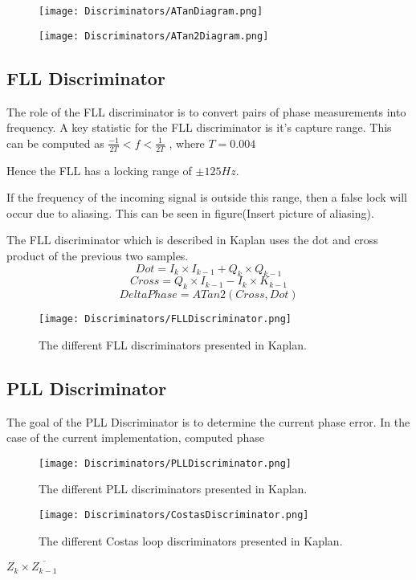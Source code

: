 \begin{figure}[!htb] 
    \centering
    \texttt{[image: Discriminators/ATanDiagram.png]} 
    \caption{}
    \label{fig:ATanDiagram}
\end{figure}

\begin{figure}[!htb] 
    \centering
    \texttt{[image: Discriminators/ATan2Diagram.png]} 
    \caption{}
    \label{fig:ATan2Diagram}
\end{figure}


\subsection{FLL Discriminator}
The role of the FLL discriminator is to convert pairs of phase measurements into frequency. A key statistic for the FLL discriminator is it's capture range. This can be computed as 
$\frac{-1}{2T} < f < \frac{1}{2T}$
, where $T = 0.004$

Hence the FLL has a locking range of $\pm 125Hz$. 

If the frequency of the incoming signal is outside this range, then a false lock will occur due to aliasing. This can be seen in figure(Insert picture of aliasing). 

The FLL discriminator which is described in Kaplan uses the dot and cross product of the previous two samples.
$$Dot = I_{k}\times I_{k-1} + Q_{k}\times Q_{k-1}$$
$$Cross = Q_{k} \times I_{k-1} - I_{k} \times K_{k-1}$$
$$DeltaPhase = ATan2(Cross,Dot)$$

\begin{figure}[!htb] 
    \centering
    \texttt{[image: Discriminators/FLLDiscriminator.png]} 
    \caption{The different FLL discriminators presented in Kaplan.\cite{Kaplan}}
    \label{fig:FLLDiscriminatorTable}
\end{figure}




\subsection{PLL Discriminator}
The goal of the PLL Discriminator is to determine the current phase error. In the case of the current implementation, computed phase 


\begin{figure}[!htb] 
    \centering
    \texttt{[image: Discriminators/PLLDiscriminator.png]} 
    \caption{The different PLL discriminators presented in Kaplan.\cite{Kaplan}}
    \label{fig:PLLDiscriminatorTable}
\end{figure}

\begin{figure}[!htb] 
    \centering
    \texttt{[image: Discriminators/CostasDiscriminator.png]} 
    \caption{The different Costas loop discriminators presented in Kaplan.\cite{Kaplan}}
    \label{fig:CostasDiscriminatorTable}
\end{figure}

$Z_{k} \times \overline{Z_{k-1}}$

%
